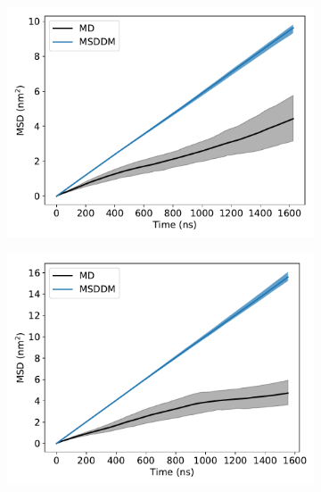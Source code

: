 \documentclass{article}
\begin{document}
  \begin{figure}
  \centering
  \begin{subfigure}{0.45\textwidth}
  \includegraphics[width=\textwidth]{URE_msddm.pdf}
  \caption{}\label{fig:URE_msddm}
  \end{subfigure}
  \begin{subfigure}{0.45\textwidth}
  \includegraphics[width=\textwidth]{GCL_msddm.pdf}
  \caption{}\label{fig:GCL_msddm}
  \end{subfigure}
  \begin{subfigure}{0.45\textwidth}

\end{subfigure}
\end{figure}
\end{document}

